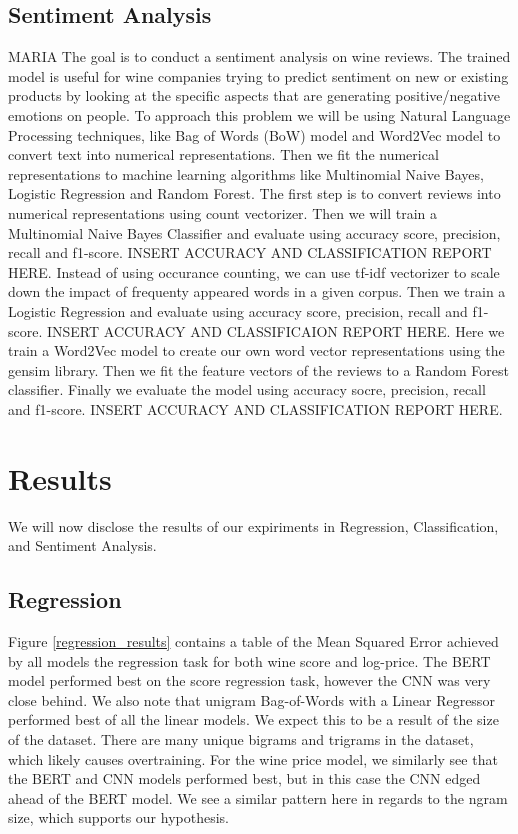 \documentclass[10pt]{IEEEtran}
\begin{document}
\subsection{Sentiment Analysis}
    MARIA
    The goal is to conduct a sentiment analysis on wine reviews. The trained model is useful for wine companies trying to predict sentiment on new or existing products by looking at the specific aspects that are generating positive/negative emotions on people.   
    To approach this problem we will be using Natural Language Processing techniques, like Bag of Words (BoW) model and Word2Vec model to convert text into numerical representations. Then we fit the numerical representations to machine learning algorithms like Multinomial Naive Bayes, Logistic Regression and Random Forest. 
    The first step is to convert reviews into numerical representations using count vectorizer. Then we will train a Multinomial Naive Bayes Classifier and evaluate using accuracy score, precision, recall and f1-score. 
    INSERT ACCURACY AND CLASSIFICATION REPORT HERE.
    Instead of using occurance counting, we can use tf-idf vectorizer to scale down the impact of frequenty appeared words in a given corpus. Then we train a Logistic Regression and evaluate using accuracy score, precision, recall and f1-score. 
    INSERT ACCURACY AND CLASSIFICAION REPORT HERE. 
    Here we train a Word2Vec model to create our own word vector representations using the gensim library. Then we fit the feature vectors of the reviews to a Random Forest classifier. Finally we evaluate the model using accuracy socre, precision, recall and f1-score. 
    INSERT ACCURACY AND CLASSIFICATION REPORT HERE. 

\section{Results}
    We will now disclose the results of our expiriments in Regression, Classification, and Sentiment Analysis.

\subsection{Regression}
    Figure \ref{regression_results} contains a table of the Mean Squared Error achieved by all models the regression task for both wine score and log-price. The BERT model performed best on the score regression task, however the CNN was very close behind. We also note that unigram Bag-of-Words with a Linear Regressor performed best of all the linear models. We expect this to be a result of the size of the dataset. There are many unique bigrams and trigrams in the dataset, which likely causes overtraining. For the wine price model, we similarly see that the BERT and CNN models performed best, but in this case the CNN edged ahead of the BERT model. We see a similar pattern here in regards to the ngram size, which supports our hypothesis.
\end{document}
